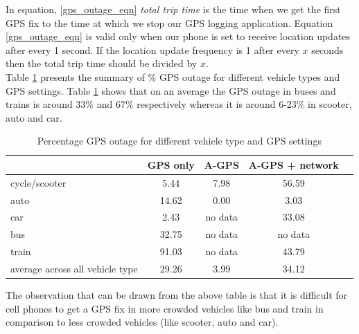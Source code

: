 \documentclass[12pt]{report}
\begin{document}
\noindent
In equation, \ref{gps_outage_eqn} \textit{total trip time} is the time when we
get the first GPS fix to the time at which we stop our GPS logging application.
Equation \ref{gps_outage_eqn} is valid only when our phone is set to receive
location updates after every 1 second. If the location update frequency is 1
after every $x$ seconds then the total trip time should be divided by $x$.
\\

Table \ref{gps_outage_table} presents the summary of \% GPS outage for different
vehicle types and GPS settings. Table \ref{gps_outage_table} shows that on an
average the GPS outage in buses and trains is around 33\% and 67\% respectively
whereas it is around 6-23\% in scooter, auto and car.


 \begin{table}[h!]
   \centering
   \caption{Percentage GPS outage for different vehicle type and GPS settings}
   \label{gps_outage_table}
   \begin{tabular}{|m{0.9in}|c|c|c|l|}
     \hline
     & GPS only & A-GPS & A-GPS + network  \\\hline 
     cycle/scooter                   & 5.44     & 7.98         & 56.59      \\ \hline
     auto                            & 14.62    & 0.00         & 3.03       \\ \hline
     car                             & 2.43     & no data      & 33.08      \\ \hline
     bus                             & 32.75    & no data      & no data    \\ \hline
     train                           & 91.03    & no data      & 43.79      \\ \hline
     average across all vehicle type & 29.26    & 3.99         & 34.12      \\ \hline 
   \end{tabular}
 \end{table}

 The observation that can be drawn from the above table is that it is difficult
 for cell phones to get a GPS fix in more crowded vehicles like bus and train in
 comparison to less crowded vehicles (like scooter, auto and car).



 
\end{document}
